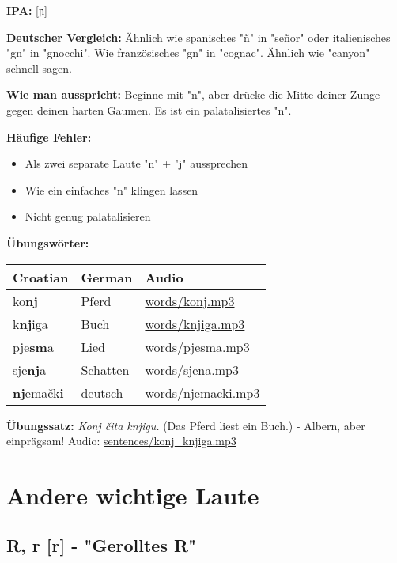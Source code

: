 \begin{tcolorbox}[breakable, colback=lightgreen!30, colframe=green!60!black, title=\textbf{Nj, nj}]

\textbf{IPA:} [ɲ]

\textbf{Deutscher Vergleich:}
Ähnlich wie spanisches "ñ" in "señor" oder italienisches "gn" in "gnocchi". Wie französisches "gn" in "cognac". Ähnlich wie "canyon" schnell sagen.

\textbf{Wie man ausspricht:}
Beginne mit "n", aber drücke die Mitte deiner Zunge gegen deinen harten Gaumen. Es ist ein palatalisiertes "n".

\textbf{Häufige Fehler:}
\begin{itemize}
    \item Als zwei separate Laute "n" + "j" aussprechen
    \item Wie ein einfaches "n" klingen lassen
    \item Nicht genug palatalisieren
\end{itemize}

\textbf{Übungswörter:}
\begin{center}
\small
\begin{tabular}{lll}
\textbf{Croatian} & \textbf{German} & \textbf{Audio} \\
\midrule
ko\textbf{nj} & Pferd & \small\url{words/konj.mp3} \\
k\textbf{nj}iga & Buch & \small\url{words/knjiga.mp3} \\
pje\textbf{sm}a & Lied & \small\url{words/pjesma.mp3} \\
sje\textbf{nj}a & Schatten & \small\url{words/sjena.mp3} \\
\textbf{nj}emačk\textbf{i} & deutsch & \small\url{words/njemacki.mp3} \\
\end{tabular}
\end{center}

\textbf{Übungssatz:}
\textit{Konj čita knjigu.}
(Das Pferd liest ein Buch.) - Albern, aber einprägsam!
Audio: \small\url{sentences/konj\_knjiga.mp3}

\end{tcolorbox}

\section{Andere wichtige Laute}

\subsection{R, r [r] - "Gerolltes R"}

